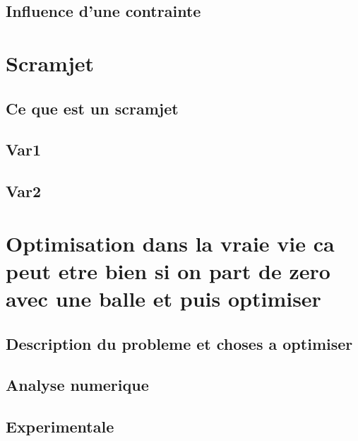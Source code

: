 \subsection{Influence d'une contrainte}

\section{Scramjet}
\subsection{Ce que est un scramjet}
\subsection{Var1}
\subsection{Var2}


\section{Optimisation dans la vraie vie ca peut etre bien si on part de zero avec une balle et puis optimiser}
\subsection{Description du probleme et choses a optimiser}
\subsection{Analyse numerique}
\subsection{Experimentale}